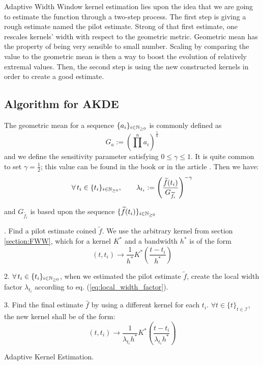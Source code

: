 \documentclass[11pt]{book}
\newcommand{\sequence}[1]{\{ #1 \}_{ i \in \N} }
\newcommand{\sequencetime}{\{t\}_{t \in \mathcal I} }
\begin{document}
Adaptive Width Window kernel estimation lies upon the idea that we are going to estimate the function through a two-step process. The first step is giving a rough estimate named the pilot estimate. Strong of that first estimate, one rescales kernels' width with respect to the geometric metric. Geometric mean has the property of being very sensible to small number. Scaling by comparing the value to the geometric mean is then a way to boost the evolution of relatively extremal values. 
Then, the second step is using the new constructed kernels in order to create a good estimate.



\subsection{Algorithm for AKDE}
\label{section:algo_awke}
The geometric mean for a sequence $\sequence{ a_i } $ is commonly defined as $$ G_{a} := \left (  \prod^n a_i \right  )^{\frac 1 n }$$ and we define the sensitivity parameter satisfying $ 0 \leq \gamma \leq 1$. It is quite common to set $\gamma = \frac 1 2$; this value can be found in the book \cite{Silverman} or in the article \cite{abramson}. Then we have:
\begin{equation}
\label{eq:local_width_factor}
\forall t_i \in \sequence{t_i}, \qquad \lambda_{t_i} :=  \left ( \frac{\widetilde{f}(t_i) }{G_{\widetilde{f_i}} } \right ) ^{ - \gamma }  
\end{equation}

and  $ G_{\widetilde{f_i}} $ is based upon the sequence $ \sequence{ \widetilde{f}(t_i) } $






\begin{algorithm}[H]
\label{algo:adaptive1}
. \quad Find a pilot estimate coined $\widetilde{f}$. We use the arbitrary kernel from section \ref{section:FWW}, which for a kernel $K^*$ and a bandwidth $h^*$ is of the form $$ (t, t_i) \to \frac 1 {h^*} K^* \left ( \frac{t - t_i}{h^*} \right ) $$ 

2. \quad $\forall t_i \in \sequence{t_i}$, when we estimated the pilot estimate $\widetilde{f}$, create the local width factor $\lambda_{t_i}$ according to eq. (\ref{eq:local_width_factor}). 

3. \quad Find the final estimate $\hat{f}$ by using a different kernel for each $t_i$. $\forall t \in \sequencetime $, the new kernel shall be of the form:
$$ (t, t_i) \to \frac 1 {\lambda_{t_i} h^*} K^* \left ( \frac{t - t_i}{\lambda_{t_i} h^*} \right )$$ 
\caption{Adaptive Kernel Estimation.}
\end{algorithm}
\end{document}
